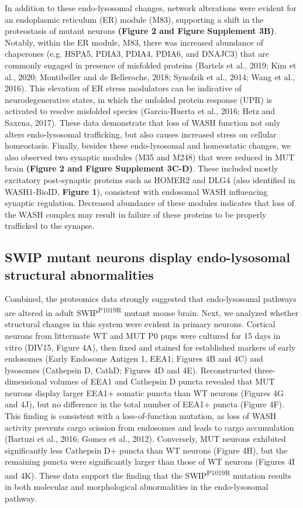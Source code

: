 In addition to these endo-lysosomal changes, network alterations were
evident for an endoplasmic reticulum (ER) module (M83), supporting a shift in
the proteostasis of mutant neurons \textbf{(Figure 2 and Figure Supplement 3B)}. Notably,
within the ER module, M83, there was increased abundance of chaperones (e.g.
HSPA5, PDIA3, PDIA4, PDIA6, and DNAJC3) that are commonly engaged in presence of
misfolded proteins (Bartels et al., 2019; Kim et al., 2020; Montibeller and de
Belleroche, 2018; Synofzik et al., 2014; Wang et al., 2016). This elevation of
ER stress modulators can be indicative of neurodegenerative states, in which the
unfolded protein response (UPR) is activated to resolve misfolded species
(Garcia-Huerta et al., 2016; Hetz and Saxena, 2017). These data demonstrate that
loss of WASH function not only alters endo-lysosomal trafficking, but also
causes increased stress on cellular homeostasis. 
Finally, besides these endo-lysosomal and homeostatic changes, we also observed
two synaptic modules (M35 and M248) that were reduced in MUT brain \textbf{(Figure
2 and Figure Supplement 3C-D)}. These included mostly excitatory post-synaptic
proteins such as HOMER2 and DLG4 (also identified in WASH1-BioID, \textbf{Figure 1}),
consistent with endosomal WASH influencing synaptic regulation. Decreased
abundance of these modules indicates that loss of the WASH complex may result in
failure of these proteins to be properly trafficked to the synapse.

\subsection{SWIP mutant neurons display endo-lysosomal structural abnormalities}

Combined, the proteomics data strongly suggested that endo-lysosomal
pathways are altered in adult SWIP\textsuperscript{P1019R} mutant mouse brain. Next, we analyzed
whether structural changes in this system were evident in primary neurons.
Cortical neurons from littermate WT and MUT P0 pups were cultured for 15 days in
vitro (DIV15, Figure 4A), then fixed and stained for established markers of
early endosomes (Early Endosome Antigen 1, EEA1; Figures 4B and 4C) and
lysosomes (Cathepsin D, CathD; Figures 4D and 4E). Reconstructed
three-dimensional volumes of EEA1 and Cathepsin D puncta revealed that MUT
neurons display larger EEA1+ somatic puncta than WT neurons (Figures 4G and 4J),
but no difference in the total number of EEA1+ puncta (Figure 4F). This finding
is consistent with a loss-of-function mutation, as loss of WASH activity
prevents cargo scission from endosomes and leads to cargo accumulation (Bartuzi
et al., 2016; Gomez et al., 2012). Conversely, MUT neurons exhibited
significantly less Cathepsin D+ puncta than WT neurons (Figure 4H), but the
remaining puncta were significantly larger than those of WT neurons (Figures 4I
and 4K). These data support the finding that the SWIP\textsuperscript{P1019R} mutation results in
both molecular and morphological abnormalities in the endo-lysosomal pathway.

